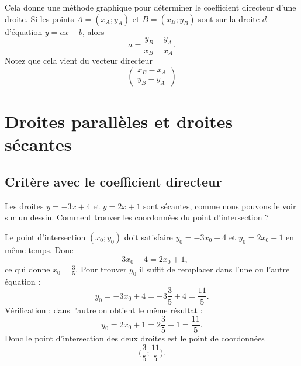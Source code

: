 Cela donne une méthode graphique pour déterminer le coefficient directeur d'une droite. Si les points \( A=(x_A;y_A)\) et \( B=(x_B;y_B)\) sont sur la droite \( d\) d'équation \( y=ax+b\), alors
\begin{equation}
    a=\frac{ y_B-y_A }{ x_B-x_A }.
\end{equation}
Notez que cela vient du vecteur directeur
\begin{equation}
    \begin{pmatrix}
        x_B-x_A    \\ 
        y_B-y_A    
    \end{pmatrix}
\end{equation}

\section{Droites parallèles et droites sécantes}

\subsection{Critère avec le coefficient directeur}

\begin{example}
    Les droites \( y=-3x+4\) et \( y=2x+1\) sont sécantes, comme nous pouvons le voir sur un dessin. Comment trouver les coordonnées du point d'intersection ?

    Le point d'intersection \( (x_0;y_0)\) doit satisfaire \( y_0=-3x_0+4\) et \( y_0=2x_0+1\) en même temps. Donc
    \begin{equation}
        -3x_0+4=2x_0+1,
    \end{equation}
    ce qui donne \( x_0=\frac{ 3 }{ 5 }\). Pour trouver \( y_0\) il suffit de remplacer dans l'une ou l'autre équation :
    \begin{equation}
        y_0=-3x_0+4=-3\frac{ 3 }{ 5 }+4=\frac{ 11 }{ 5 }.
    \end{equation}
    Vérification : dans l'autre on obtient le même résultat :
    \begin{equation}
        y_0=2x_0+1=2\frac{ 3 }{ 5 }+1=\frac{ 11 }{ 5 }.
    \end{equation}
    Donc le point d'intersection des deux droites est le point de coordonnées
    \begin{equation}
        \big( \frac{ 3 }{ 5 };\frac{ 11 }{ 5 } \big).
    \end{equation}
\end{example}

